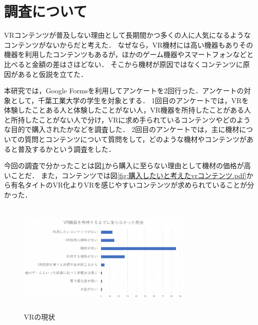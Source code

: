 \documentclass[twocolumn,10pt,a4j]{ltjsarticle}
\begin{document}



\section{調査について}
VRコンテンツが普及しない理由として長期間かつ多くの人に人気になるようなコンテンツがないからだと考えた．
なぜなら，VR機材には高い機器もありその機器を利用したコンテンツもあるが，ほかのゲーム機器やスマートフォンなどと比べると金額の差はさほどない．
そこから機材が原因ではなくコンテンツに原因があると仮説を立てた．

本研究では，Google Formsを利用してアンケートを2回行った．アンケートの対象として，千葉工業大学の学生を対象とする．
1回目のアンケートでは，VRを体験したことある人と体験したことがない人，VR機器を所持したことがある人と所持したことがない人で分け，VRに求め手られているコンテンツやどのような目的で購入されたかなどを調査した．
2回目のアンケートでは，主に機材についての質問とコンテンツについて質問をして，どのような機材やコンテンツがあると普及するかという調査をした．

今回の調査で分かったことは図\ref{fig:vr機器を所持するまでに至らなかった理由.pdf}から購入に至らない理由として機材の価格が高いことだ．
また，コンテンツでは図\ref{fig:購入したいと考えたvrコンテンツ.pdf}から有名タイトのVR化よりVRを感じやすいコンテンツが求められていることが分かった．

\begin{figure}[h]
\begin{center}
 \includegraphics[clip,width=85mm,height=55mm]{vr機器を所持するまでに至らなかった理由.pdf}
\end{center}
 \caption{VRの現状}
 \label{fig:vr機器を所持するまでに至らなかった理由.pdf}
\end{figure}
\end{document}
